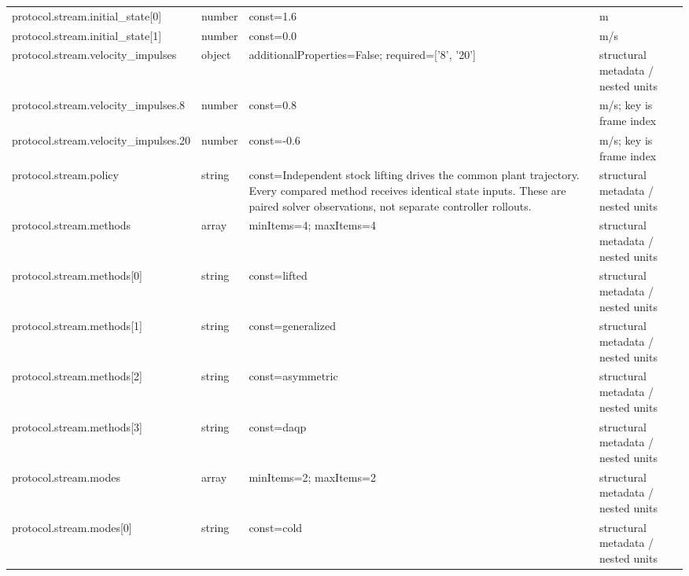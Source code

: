 \begin{longtable}{@{}>{\raggedright\arraybackslash}p{}>{\raggedright\arraybackslash}p{}>{\raggedright\arraybackslash}p{}>{\raggedright\arraybackslash}p{}@{}}
protocol.\allowbreak{}stream.\allowbreak{}initial\_\allowbreak{}state[0] & number & const=\allowbreak{}1.\allowbreak{}6 & m\\
protocol.\allowbreak{}stream.\allowbreak{}initial\_\allowbreak{}state[1] & number & const=\allowbreak{}0.\allowbreak{}0 & m/\allowbreak{}s\\
protocol.\allowbreak{}stream.\allowbreak{}velocity\_\allowbreak{}impulses & object & additionalProperties=\allowbreak{}False; required=\allowbreak{}['8', '20'] & structural metadata /\allowbreak{} nested units\\
protocol.\allowbreak{}stream.\allowbreak{}velocity\_\allowbreak{}impulses.\allowbreak{}8 & number & const=\allowbreak{}0.\allowbreak{}8 & m/\allowbreak{}s; key is frame index\\
protocol.\allowbreak{}stream.\allowbreak{}velocity\_\allowbreak{}impulses.\allowbreak{}20 & number & const=\allowbreak{}-0.\allowbreak{}6 & m/\allowbreak{}s; key is frame index\\
protocol.\allowbreak{}stream.\allowbreak{}policy & string & const=\allowbreak{}Independent stock lifting drives the common plant trajectory.\allowbreak{} Every compared method receives identical state inputs.\allowbreak{} These are paired solver observations, not separate controller rollouts.\allowbreak{} & structural metadata /\allowbreak{} nested units\\
protocol.\allowbreak{}stream.\allowbreak{}methods & array & minItems=\allowbreak{}4; maxItems=\allowbreak{}4 & structural metadata /\allowbreak{} nested units\\
protocol.\allowbreak{}stream.\allowbreak{}methods[0] & string & const=\allowbreak{}lifted & structural metadata /\allowbreak{} nested units\\
protocol.\allowbreak{}stream.\allowbreak{}methods[1] & string & const=\allowbreak{}generalized & structural metadata /\allowbreak{} nested units\\
protocol.\allowbreak{}stream.\allowbreak{}methods[2] & string & const=\allowbreak{}asymmetric & structural metadata /\allowbreak{} nested units\\
protocol.\allowbreak{}stream.\allowbreak{}methods[3] & string & const=\allowbreak{}daqp & structural metadata /\allowbreak{} nested units\\
protocol.\allowbreak{}stream.\allowbreak{}modes & array & minItems=\allowbreak{}2; maxItems=\allowbreak{}2 & structural metadata /\allowbreak{} nested units\\
protocol.\allowbreak{}stream.\allowbreak{}modes[0] & string & const=\allowbreak{}cold & structural metadata /\allowbreak{} nested units\\

\end{longtable}
